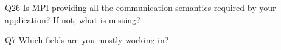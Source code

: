 \begin{description}%
\item{Q26} Is MPI providing all the communication semantics required by your application? If not, what is missing?%
\item{Q7} Which fields are you mostly working in?%
\end{description}%

